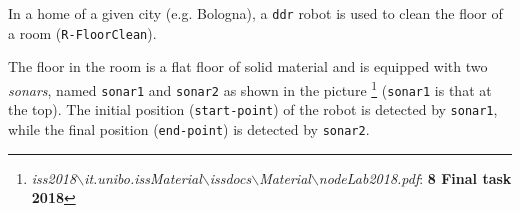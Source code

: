 \documentclass{../llncs}
\newcommand{\code}[1]{{\color{blue}\small{\texttt{#1}}}}
\begin{document}

In a home of a given city (e.g. Bologna), a \texttt{ddr} robot is used to clean the floor of a room (\code{R-FloorClean}).

The floor in the room is a flat floor of solid material and is equipped with two \emph{sonars}, named \code{sonar1} and \code{sonar2} as shown in the picture
\footnote{\textit{iss2018$\backslash$it.unibo.issMaterial$\backslash$issdocs$\backslash$Material$\backslash$nodeLab2018.pdf}: \textbf{8 Final task 2018}}
(\code{sonar1} is that at the top). The initial position (\code{start-point}) of the robot is detected by \code{sonar1}, while the final position (\code{end-point}) is detected by \code{sonar2}.\\
\end{document}
